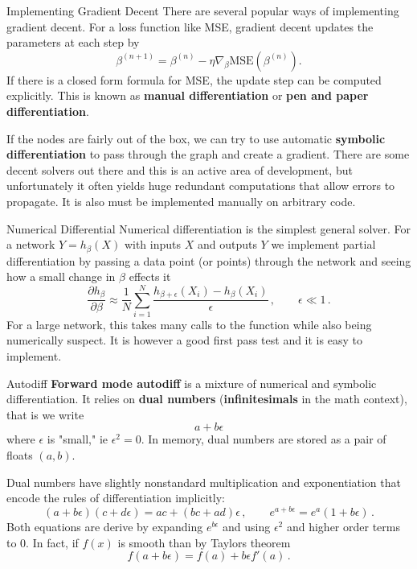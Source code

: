 \documentclass[10pt, table, dvipsnames,xcdraw, handout]{beamer}
\begin{document}
\begin{frame}[fragile]{Implementing Gradient Decent}
There are several popular ways of implementing gradient decent. For a loss function like MSE, gradient decent updates the parameters at each step by
$$
\beta^{(n+1)} = \beta^{(n)} - \eta \nabla_{\beta} \text{MSE}(\beta^{(n)}).
$$\pause
If there is a closed form formula for MSE, the update step can be computed explicitly. This is known as \textbf{manual differentiation} or \textbf{pen and paper differentiation}. \pause

If the nodes are fairly out of the box, we can try to use automatic \textbf{symbolic differentiation} to pass through the graph and create a gradient. There are some decent solvers out there and this is an active area of development, but unfortunately it often yields huge redundant computations that allow errors to propagate. It is also must be implemented manually on arbitrary code.
\end{frame}



\begin{frame}[fragile]{Numerical Differential }
Numerical differentiation is the simplest general solver. For a network $Y = h_\beta(X)$ with inputs $X$ and outputs $Y$ we implement partial differentiation by passing a data point (or points) through the network and seeing how a small change in $\beta$ effects it
$$
\frac{\partial h_\beta}{\partial \beta} \approx \frac{1}{N}\sum_{i=1}^N\frac{h_{\beta+\epsilon}(X_i) - h_{\beta}(X_i) }{\epsilon}\,, \hspace{2em} \epsilon\ll 1\,.
$$\pause
For a large network, this takes many calls to the function while also being numerically suspect. It is however a good first pass test and it is easy to implement. 
\end{frame}



\begin{frame}[fragile]{Autodiff}
\textbf{Forward mode autodiff} is a mixture of numerical and symbolic differentiation. It relies on \textbf{dual numbers} (\textbf{infinitesimals} in the math context), that is we write
$$
a+b\epsilon
$$
where $\epsilon$ is "small," ie $\epsilon^2 = 0$. In memory, dual numbers are stored as a pair of floats $(a,b)$. \pause

Dual numbers have slightly nonstandard multiplication and exponentiation that encode the rules of differentiation implicitly:
$$
(a+b\epsilon)(c+d\epsilon) = ac+(bc+ad)\epsilon\,,\hspace{2em} e^{a+b\epsilon} = e^a(1+b\epsilon)\,.
$$
Both equations are derive by expanding $e^{b\epsilon}$ and using $\epsilon^2$ and higher order terms to 0. \pause In fact, if $f(x)$ is smooth than by Taylors theorem
$$
f(a+b\epsilon) = f(a)+b\epsilon f'(a)\,.
$$
\end{frame}
\end{document}
